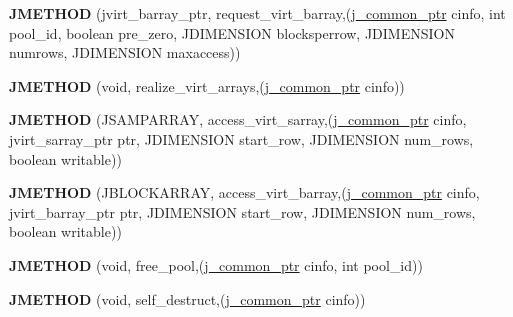 \begin{DoxyCompactItemize}
\item 
\mbox{\label{structjpeg__memory__mgr_aee93326ad6a64714443e90044614d2a6}} 
{\bfseries J\+M\+E\+T\+H\+OD} (jvirt\+\_\+barray\+\_\+ptr, request\+\_\+virt\+\_\+barray,(\hyperlink{structjpeg__common__struct}{j\+\_\+common\+\_\+ptr} cinfo, int pool\+\_\+id, boolean pre\+\_\+zero, J\+D\+I\+M\+E\+N\+S\+I\+ON blocksperrow, J\+D\+I\+M\+E\+N\+S\+I\+ON numrows, J\+D\+I\+M\+E\+N\+S\+I\+ON maxaccess))
\item 
\mbox{\label{structjpeg__memory__mgr_a35cc0c3b3ecbc7209cdc23b2255932d8}} 
{\bfseries J\+M\+E\+T\+H\+OD} (void, realize\+\_\+virt\+\_\+arrays,(\hyperlink{structjpeg__common__struct}{j\+\_\+common\+\_\+ptr} cinfo))
\item 
\mbox{\label{structjpeg__memory__mgr_a747ad4316a4794b13f9fdff4f6f699ca}} 
{\bfseries J\+M\+E\+T\+H\+OD} (J\+S\+A\+M\+P\+A\+R\+R\+AY, access\+\_\+virt\+\_\+sarray,(\hyperlink{structjpeg__common__struct}{j\+\_\+common\+\_\+ptr} cinfo, jvirt\+\_\+sarray\+\_\+ptr ptr, J\+D\+I\+M\+E\+N\+S\+I\+ON start\+\_\+row, J\+D\+I\+M\+E\+N\+S\+I\+ON num\+\_\+rows, boolean writable))
\item 
\mbox{\label{structjpeg__memory__mgr_aa460f4b500825e051306b8ce5583d052}} 
{\bfseries J\+M\+E\+T\+H\+OD} (J\+B\+L\+O\+C\+K\+A\+R\+R\+AY, access\+\_\+virt\+\_\+barray,(\hyperlink{structjpeg__common__struct}{j\+\_\+common\+\_\+ptr} cinfo, jvirt\+\_\+barray\+\_\+ptr ptr, J\+D\+I\+M\+E\+N\+S\+I\+ON start\+\_\+row, J\+D\+I\+M\+E\+N\+S\+I\+ON num\+\_\+rows, boolean writable))
\item 
\mbox{\label{structjpeg__memory__mgr_a7e7e063767441999982d22c5cc0e9423}} 
{\bfseries J\+M\+E\+T\+H\+OD} (void, free\+\_\+pool,(\hyperlink{structjpeg__common__struct}{j\+\_\+common\+\_\+ptr} cinfo, int pool\+\_\+id))
\item 
\mbox{\label{structjpeg__memory__mgr_ae80ddea0ba4f845f91d3a30e350b5f44}} 
{\bfseries J\+M\+E\+T\+H\+OD} (void, self\+\_\+destruct,(\hyperlink{structjpeg__common__struct}{j\+\_\+common\+\_\+ptr} cinfo))
\item 
\mbox{\label{structjpeg__memory__mgr_a9372ad24444dda23175cc9203105911c}} 

\end{DoxyCompactItemize}
